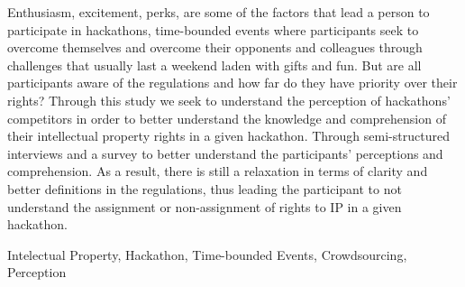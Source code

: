 Enthusiasm, excitement, perks, are some of the factors that lead a person to participate in hackathons, time-bounded events where participants seek to overcome themselves and overcome their opponents and colleagues through challenges that usually last a weekend laden with gifts and fun. But are all participants aware of the regulations and how far do they have priority over their rights? Through this study we seek to understand the perception of hackathons' competitors in order to better understand the knowledge and comprehension of their intellectual property rights in a given hackathon. Through semi-structured interviews and a survey to better understand the participants' perceptions and comprehension. As a result, there is still a relaxation in terms of clarity and better definitions in the regulations, thus leading the participant to not understand the assignment or non-assignment of rights to IP in a given hackathon.

\begin{keywords}
Intelectual Property, Hackathon, Time-bounded Events, Crowdsourcing, Perception
\end{keywords}